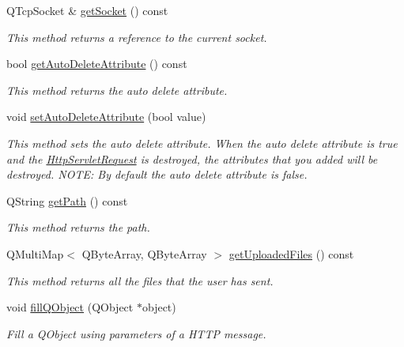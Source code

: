 \begin{DoxyCompactItemize}
Q\+Tcp\+Socket \& \hyperlink{class_c_w_f_1_1_http_servlet_request_ad6496a8dcda50dd7ec9f389b4cbb4349}{get\+Socket} () const 
\begin{DoxyCompactList}\small\item\em This method returns a reference to the current socket. \end{DoxyCompactList}\item 
bool \hyperlink{class_c_w_f_1_1_http_servlet_request_abe9c009a7010f02552da1370dddd0484}{get\+Auto\+Delete\+Attribute} () const 
\begin{DoxyCompactList}\small\item\em This method returns the auto delete attribute. \end{DoxyCompactList}\item 
void \hyperlink{class_c_w_f_1_1_http_servlet_request_a4f884f904ea3793511087b6311fb9e47}{set\+Auto\+Delete\+Attribute} (bool value)
\begin{DoxyCompactList}\small\item\em This method sets the auto delete attribute. When the auto delete attribute is true and the \hyperlink{class_c_w_f_1_1_http_servlet_request}{Http\+Servlet\+Request} is destroyed, the attributes that you added will be destroyed. N\+O\+T\+E\+: By default the auto delete attribute is false. \end{DoxyCompactList}\item 
Q\+String \hyperlink{class_c_w_f_1_1_http_servlet_request_ad26dd1fc71d21453fc0e28ab602f9603}{get\+Path} () const 
\begin{DoxyCompactList}\small\item\em This method returns the path. \end{DoxyCompactList}\item 
Q\+Multi\+Map$<$ Q\+Byte\+Array, Q\+Byte\+Array $>$ \hyperlink{class_c_w_f_1_1_http_servlet_request_a67e5b7ef1e55618ff787ab3d5e229246}{get\+Uploaded\+Files} () const 
\begin{DoxyCompactList}\small\item\em This method returns all the files that the user has sent. \end{DoxyCompactList}\item 
void \hyperlink{class_c_w_f_1_1_http_servlet_request_a82a05ddb8d91c72a28846ffc0e811ee7}{fill\+Q\+Object} (Q\+Object $\ast$object)
\begin{DoxyCompactList}\small\item\em Fill a Q\+Object using parameters of a H\+T\+T\+P message. \end{DoxyCompactList}\end{DoxyCompactItemize}
